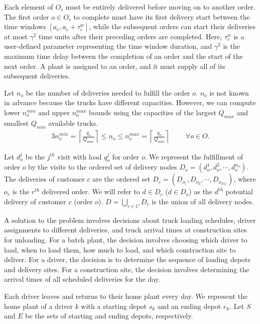 \documentclass[]{article}
\begin{document}
Each element of $O_c$ must be entirely delivered before moving on to another order. The first order $o \in O_c$ to complete must have its first delivery start between the time windows $\left[a_c, a_c + \tau^w_c \right]$, while the subsequent orders can start their deliveries at most $\gamma^2$ time units after their preceding orders are completed. Here, $\tau^w_c$ is a user-defined parameter representing the time window duration, and $\gamma^2$ is the maximum time delay between the completion of an order and the start of the next order. A plant is assigned to an order, and it must supply all of its subsequent deliveries.

Let $n_o$ be the number of deliveries needed to fulfill the order $o$. $n_o$ is not known in advance because the trucks have different capacities. However, we can compute lower $n_o^{min}$ and upper $n_o^{max}$ bounds using the capacities of the largest $Q_{max}$ and smallest $Q_{min}$ available trucks.
\begin{alignat}{3}
    \label{mod:c0}
    n_o^{min} = \left\lceil \frac{q_o}{Q_{max}} \right\rceil \leq n_o \leq n_o^{max} = \left\lceil \frac{q_o}{Q_{min}} \right\rceil & \text{ } &
    \forall  o \in O.
\end{alignat}

Let $d^j_{o}$ be the $j^{th}$ visit with load $q^j_{o}$ for order $o$. We represent the fulfillment of order $o$ by the visits to the ordered set of delivery nodes $D_o= \left(d^1_{o},d^2_{o},\cdots, d^{n_o}_{o}\right)$. The deliveries of customer $c$ are the ordered set $D_c= (D_{o_1}, D_{o_2},\cdots,D_{o_{|O_c|}})$, where $o_r$ is the $r^{th}$ delivered order. We will refer to $d \in D_c$ ($d \in D_o$) as the $d^{th}$ potential delivery of customer $c$ (order $o$). $D=\bigcup_{c\in C} D_c$ is the union of all delivery nodes.

A solution to the problem involves decisions about truck loading schedules, driver assignments to different deliveries, and truck arrival times at construction sites for unloading. For a batch plant, the decision involves choosing which driver to load, when to load them, how much to load, and which construction site to deliver. For a driver, the decision is to determine the sequence of loading depots and delivery sites. For a construction site, the decision involves determining the arrival times of all scheduled deliveries for the day.

Each driver leaves and returns to their home plant every day. We represent the home plant of a driver $k$ with a starting depot $s_k$ and an ending depot $e_k$. Let $S$ and $E$ be the sets of starting and ending depots, respectively.
\end{document}
